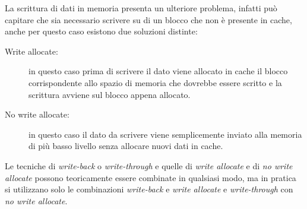 La scrittura di dati in memoria presenta un ulteriore problema, infatti può capitare che sia necessario scrivere su di un blocco che non è presente in cache, anche per questo caso esistono due soluzioni distinte:
\begin{description}
\item[Write allocate:] in questo caso prima di scrivere il dato viene allocato in cache il blocco corrispondente allo spazio di memoria che dovrebbe essere scritto e la scrittura avviene sul blocco appena allocato.
\item[No write allocate:] in questo caso il dato da scrivere viene semplicemente inviato alla memoria di più basso livello senza allocare nuovi dati in cache.
\end{description}
Le tecniche di \emph{write-back} o \emph{write-through} e quelle di \emph{write allocate} e di \emph{no write allocate} possono teoricamente essere combinate in qualsiasi modo, ma in pratica si utilizzano solo le combinazioni \emph{write-back} e \emph{write allocate} e \emph{write-through} con \emph{no write allocate}.
